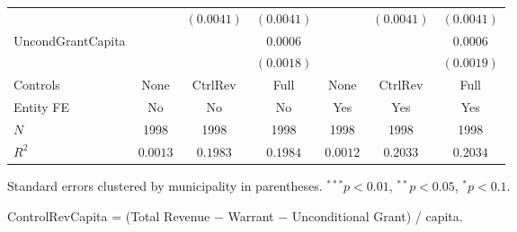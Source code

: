 \documentclass[border=10pt,varwidth=25cm]{standalone}
\renewenvironment{table}[1][]{}{}
\begin{document}
\begin{table}[H]
\begin{minipage}{\textwidth}
\begin{tabular}{lcccccc}
         &  & $(0.0041)$ & $(0.0041)$ &  & $(0.0041)$ & $(0.0041)$ \\[4pt]
        UncondGrantCapita &  &  & $0.0006$ &  &  & $0.0006$ \\
         &  &  & $(0.0018)$ &  &  & $(0.0019)$ \\[4pt]
        \midrule
        Controls & None & CtrlRev & Full & None & CtrlRev & Full \\
        Entity FE & No & No & No & Yes & Yes & Yes \\
        $N$ & 1998 & 1998 & 1998 & 1998 & 1998 & 1998 \\
        $R^2$ & $0.0013$ & $0.1983$ & $0.1984$ & $0.0012$ & $0.2033$ & $0.2034$ \\
        \bottomrule
    \end{tabular}

    \vspace{6pt}
    {\scriptsize Standard errors clustered by municipality in parentheses. $^{***}p<0.01$, $^{**}p<0.05$, $^{*}p<0.1$.}

    {\scriptsize ControlRevCapita = (Total Revenue $-$ Warrant $-$ Unconditional Grant) / capita.}
    \end{minipage}
\end{table}
\end{document}
